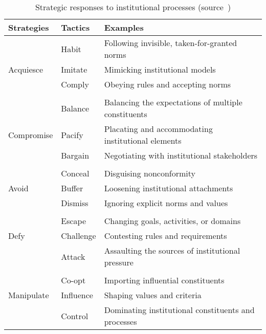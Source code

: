 \begin{table}[htdp!]
  \caption[Strategic responses to institutional processes]{Strategic responses to institutional processes (source~\cite{Oliver:1991tm})}\label{tab:Oliver:1991}
\centering
\begin{tabular}{lll} 
  \toprule
	Strategies & Tactics & Examples \\ 
	\midrule
	          &Habit        &Following invisible, taken-for-granted norms\\
Acquiesce     &Imitate      &Mimicking institutional models\\
	          &Comply       &Obeying rules and accepting norms\\
	\\
	          &Balance       &Balancing the expectations of multiple constituents\\
Compromise    &Pacify        &Placating and accommodating institutional elements\\
	          &Bargain       &Negotiating with institutional stakeholders\\
	\\
	          &Conceal       &Disguising nonconformity\\
Avoid         &Buffer        &Loosening institutional attachments\\
              &Dismiss       &Ignoring explicit norms and values\\
    \\
              &Escape        &Changing goals, activities, or domains\\
Defy          &Challenge     &Contesting rules and requirements\\
              &Attack        &Assaulting the sources of institutional pressure\\
   \\  
              &Co-opt        &Importing influential constituents\\
Manipulate    & Influence    &Shaping values and criteria\\
              &Control       &Dominating institutional constituents and processes\\
	\bottomrule
\end{tabular}
\end{table}

